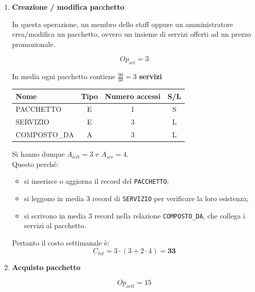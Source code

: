 \documentclass[a4paper,12pt]{report}
\begin{document}
\begin{enumerate}
	\item {\large \textbf{Creazione / modifica pacchetto} \label{op5}}

	      In questa operazione, un membro dello staff oppure un amministratore \newline
	      crea/modifica un pacchetto, ovvero un insieme di servizi offerti ad un prezzo \newline
	      promozionale.

	      $$
		      {Op}_{set}=3
	      $$

	      In media ogni pacchetto contiene $\frac{90}{30}=3$ \textbf{servizi}

	      \begin{table}[H]
		      \centering
		      \small
		      \renewcommand{\arraystretch}{1.15}
		      \begin{tabularx}{0.8\textwidth}{|X|c|c|c|}
			      \hline
			      \rowcolor{gray!20}
			      \textbf{Nome} & \textbf{Tipo} & \textbf{Numero accessi} & \textbf{S/L} \\
			      \hline
			      PACCHETTO     & E             & 1                       & S            \\
			      SERVIZIO      & E             & 3                       & L            \\
			      COMPOSTO\_DA  & A             & 3                       & L            \\
			      \hline
		      \end{tabularx}
	      \end{table}
	      Si hanno dunque $A_{lett}=3$ e $A_{scr}=4$. \\
	      Questo perché:
	      \begin{itemize}
		      \item si inserisce o aggiorna il record del \texttt{PACCHETTO};
		      \item si leggono in media 3 record di \texttt{SERVIZIO} per verificare la loro esistenza;
		      \item si scrivono in media 3 record nella relazione \texttt{COMPOSTO\_DA}, che collega i 	servizi al pacchetto.
	      \end{itemize}

	      Pertanto il costo settimanale è:
	      $$
		      C_{tot} = 3 \cdot (3 + 2 \cdot 4) = \mathbf{33}
	      $$

	\item {\large \textbf{Acquisto pacchetto}} \label{op6}

	      $$
		      {Op}_{sett} = 15
	      $$


\end{enumerate}
\end{document}
